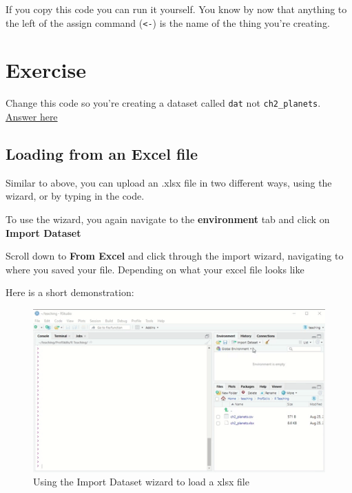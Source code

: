 \documentclass[
]{book}
\begin{document}
If you copy this code you can run it yourself. You know by now that anything to the left of the assign command (\texttt{\textless{}-}) is the name of the thing you're creating.

\hypertarget{ex_loadcsv}{%
\section{Exercise}\label{ex_loadcsv}}

Change this code so you're creating a dataset called \texttt{dat} not \texttt{ch2\_planets}. \protect\hyperlink{ans_loadcsv}{Answer here}

\hypertarget{loading-from-an-excel-file}{%
\subsection{Loading from an Excel file}\label{loading-from-an-excel-file}}

Similar to above, you can upload an .xlsx file in two different ways, using the wizard, or by typing in the code.

To use the wizard, you again navigate to the \textbf{environment} tab and click on \textbf{Import Dataset}

Scroll down to \textbf{From Excel} and click through the import wizard, navigating to where you saved your file. Depending on what your excel file looks like

Here is a short demonstration:

\begin{figure}

{\centering \includegraphics{images/03_data/excel_open} 

}

\caption{Using the Import Dataset wizard to load a xlsx file}\label{fig:unnamed-chunk-60}
\end{figure}
\end{document}
